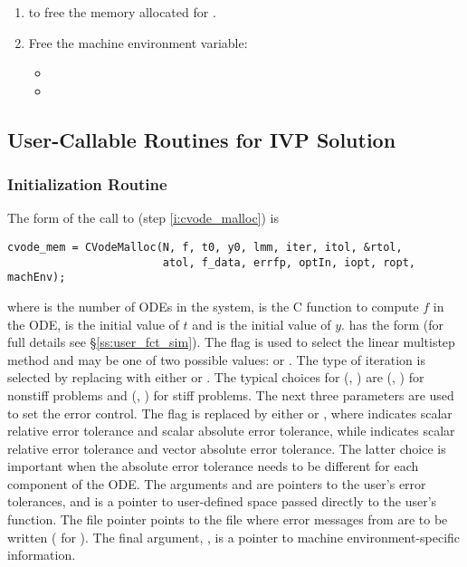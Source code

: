 \begin{enumerate}
\item {} to free the memory allocated for {\cvodes}.
  
\item Free the machine environment variable:
  \begin{itemize}
  \item {\s}
  \item {\p}
  \end{itemize}
  
\end{enumerate}

\subsection{User-Callable Routines for IVP Solution}
\label{ss:cvodes_fct_sim}

\subsubsection{{\cvodes} Initialization Routine}\label{sss:cvodemalloc}

The form of the call to  (step \ref{i:cvode_malloc}) is
\begin{verbatim}
cvode_mem = CVodeMalloc(N, f, t0, y0, lmm, iter, itol, &rtol, 
                        atol, f_data, errfp, optIn, iopt, ropt, machEnv);
\end{verbatim}
where  is the number of ODEs in the system, 
is the C function to compute $f$ in the ODE,  is the initial
value of $t $ and  is the initial value of $y$. 
 has the form  (for full details
see \S\ref{ss:user_fct_sim}).
The flag  is used to select the linear multistep method and may be one of two
possible values:  or . The type of iteration is
selected by replacing  with either  or 
. The typical choices for (, ) are
(, ) for nonstiff problems and
(, ) for stiff problems.
The next three parameters are used to set the error control. 
The flag  is replaced by either  or 
, where  indicates scalar relative error tolerance and
scalar absolute error tolerance, while  indicates scalar
relative error tolerance and vector absolute error tolerance. The
latter choice is important when the absolute error tolerance needs to
be different for each component of the ODE. The arguments 
and  are pointers to the user's error tolerances, and 
 is a pointer to user-defined space passed directly to
the user's  function. The file pointer  points to
the file where error messages from {\cvodes} are to be written 
( for ). 
The final argument, , is a pointer to machine 
environment-specific information.

